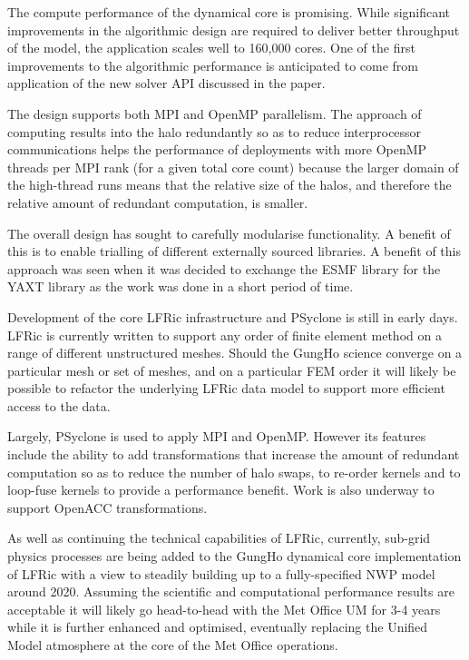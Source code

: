 \documentclass[review,times]{elsarticle}
\begin{document}
The compute performance of the dynamical core is promising. While
significant improvements in the algorithmic design are required to
deliver better throughput of the model, the application scales well to
160,000 cores. One of the first improvements to the algorithmic
performance is anticipated to come from application of the new solver
API discussed in the paper.

The design supports both MPI and OpenMP parallelism. The approach of
computing results into the halo redundantly so as to reduce
interprocessor communications helps the performance of deployments
with more OpenMP threads per MPI rank (for a given total core count)
because the larger domain of the high-thread runs means that the
relative size of the halos, and therefore the relative amount of
redundant computation, is smaller.

The overall design has sought to carefully modularise functionality. A
benefit of this is to enable trialling of different externally sourced
libraries. A benefit of this approach was seen when it was decided to
exchange the ESMF library for the YAXT library as the work was done in
a short period of time.

Development of the core LFRic infrastructure and PSyclone is still in
early days. LFRic is currently written to support any order of finite
element method on a range of different unstructured meshes. Should the
GungHo science converge on a particular mesh or set of meshes, and on
a particular FEM order it will likely be possible to refactor the
underlying LFRic data model to support more efficient access to the
data.

Largely, PSyclone is used to apply MPI and OpenMP. However its
features include the ability to add transformations that increase the
amount of redundant computation so as to reduce the number of halo
swaps, to re-order kernels and to loop-fuse kernels to provide a
performance benefit. Work is also underway to support OpenACC
transformations.

As well as continuing the technical capabilities of LFRic, currently,
sub-grid physics processes are being added to the GungHo dynamical
core implementation of LFRic with a view to steadily building up to a
fully-specified NWP model around 2020. Assuming the scientific and
computational performance results are acceptable it will likely go
head-to-head with the Met Office UM for 3-4 years while it is further
enhanced and optimised, eventually replacing the Unified Model
atmosphere at the core of the Met Office operations.
\end{document}
